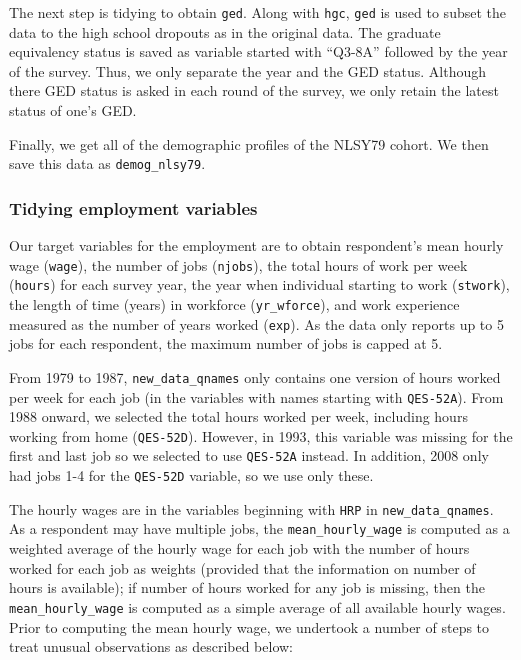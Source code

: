 \documentclass{article}
\begin{document}
The next step is tidying to obtain \texttt{ged}. Along with \texttt{hgc}, \texttt{ged} is used to subset the data to the high school dropouts as in the original data. The graduate equivalency status is saved as variable started with ``Q3-8A'' followed by the year of the survey. Thus, we only separate the year and the GED status. Although there GED status is asked in each round of the survey, we only retain the latest status of one's GED.

Finally, we get all of the demographic profiles of the NLSY79 cohort. We then save this data as \texttt{demog\_nlsy79}.

\hypertarget{tidyemp}{%
\subsubsection{Tidying employment variables}\label{tidyemp}}

Our target variables for the employment are to obtain respondent's mean hourly wage (\texttt{wage}), the number of jobs (\texttt{njobs}), the total hours of work per week (\texttt{hours}) for each survey year, the year when individual starting to work (\texttt{stwork}), the length of time (years) in workforce (\texttt{yr\_wforce}), and work experience measured as the number of years worked (\texttt{exp}). As the data only reports up to 5 jobs for each respondent, the maximum number of jobs is capped at 5.

From 1979 to 1987, \texttt{new\_data\_qnames} only contains one version of hours worked per week for each job (in the variables with names starting with \texttt{QES-52A}). From 1988 onward, we selected the total hours worked per week, including hours working from home (\texttt{QES-52D}). However, in 1993, this variable was missing for the first and last job so we selected to use \texttt{QES-52A} instead. In addition, 2008 only had jobs 1-4 for the \texttt{QES-52D} variable, so we use only these.

The hourly wages are in the variables beginning with \texttt{HRP} in \texttt{new\_data\_qnames}. As a respondent may have multiple jobs, the \texttt{mean\_hourly\_wage} is computed as a weighted average of the hourly wage for each job with the number of hours worked for each job as weights (provided that the information on number of hours is available); if number of hours worked for any job is missing, then the \texttt{mean\_hourly\_wage} is computed as a simple average of all available hourly wages. Prior to computing the mean hourly wage, we undertook a number of steps to treat unusual observations as described below:
\end{document}
